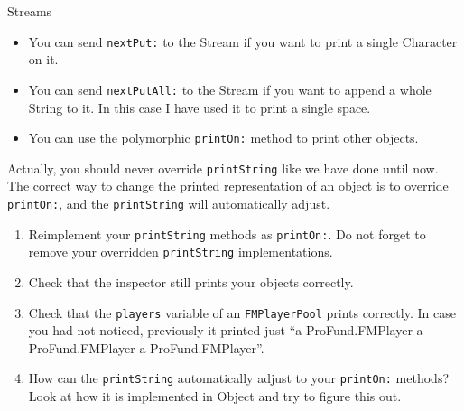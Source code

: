 \documentclass[a4paper,10pt]{scrartcl}
\begin{document}
\begin{exercise}{Streams}
\begin{itemize}
\item You can send \verb!nextPut:! to the Stream if you want to print
  a single Character on it.
\item You can send \verb!nextPutAll:! to the Stream if you want to append
  a whole String to it.  In this case I have used it to print a single
  space.
\item You can use the polymorphic \verb!printOn:! method to print other
  objects.
\end{itemize}

Actually, you should never override \verb!printString! like we have done
until now.  The correct way to change the printed representation of an object
is to override \verb!printOn:!, and the \verb!printString! will automatically
adjust.

\begin{enumerate}

\item Reimplement your \verb!printString! methods as \verb!printOn:!.
  Do not forget to remove your overridden \verb!printString! implementations.

\item Check that the inspector still prints your objects correctly.

\item Check that the \verb!players! variable of an \verb!FMPlayerPool!
  prints correctly.  In case you had not noticed, previously it printed
  just ``a ProFund.FMPlayer a ProFund.FMPlayer a ProFund.FMPlayer''.

\item How can the \verb!printString! automatically adjust to your
  \verb!printOn:! methods?  Look at how it is implemented in Object and
  try to figure this out.
\end{enumerate}
\end{exercise}
\end{document}
